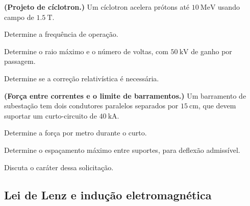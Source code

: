 \begin{questao}[4]{}

\textbf{(Projeto de cíclotron.)} Um cíclotron acelera prótons até
$\SI{10}{\mega\electronvolt}$ usando campo de $\SI{1.5}{\tesla}$.
\begin{itensq}
\item Determine a frequência de operação.
\item Determine o raio máximo e o número de voltas, com
      $\SI{50}{\kilo\volt}$ de ganho por passagem.
\item Determine se a correção relativística é necessária.
\end{itensq}


\end{questao}
\begin{questao}[4]{}

\textbf{(Força entre correntes e o limite de barramentos.)} Um barramento de
subestação tem dois condutores paralelos separados por $\SI{15}{\centi\meter}$,
que devem suportar um curto-circuito de $\SI{40}{\kilo\ampere}$.
\begin{itensq}
\item Determine a força por metro durante o curto.
\item Determine o espaçamento máximo entre suportes, para deflexão admissível.
\item Discuta o caráter dessa solicitação.
\end{itensq}


\end{questao}


\subsection{Lei de Lenz e indução eletromagnética}

